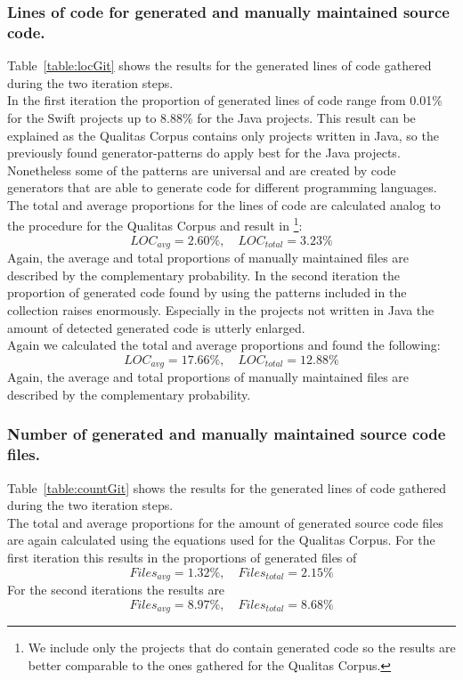 \subsubsection{Lines of code for generated and manually maintained source code.}
Table~\ref{table:locGit} shows the results for the generated lines of code gathered during the two iteration steps.\\
In the first iteration the proportion of generated lines of code range from 0.01\% for the Swift projects up to 8.88\% for the Java projects. This result can be explained as the Qualitas Corpus contains only projects written in Java, so the previously found generator-patterns do apply best for the Java projects. Nonetheless some of the patterns are universal and are created by code generators that are able to generate code for different programming languages.\\
The total and average proportions for the lines of code are calculated analog to the procedure for the Qualitas Corpus and result in
\footnote{
	\label{note:onlyGenerated}
	We include only the projects that do contain generated code so the results are better comparable to the ones gathered for the Qualitas Corpus.
}:
\begin{equation}
	\label{eq:locGit_1}
	LOC_{avg} = 2.60\%, \quad LOC_{total} = 3.23\%
\end{equation}
Again, the average and total proportions of manually maintained files are described by the complementary probability.
In the second iteration the proportion of generated code found by using the patterns included in the collection raises enormously. Especially in the projects not written in Java the amount of detected generated code is utterly enlarged.\\
Again we calculated the total and average proportions and found the following:
\begin{equation}
\label{eq:locGit_2}
LOC_{avg} = 17.66\%, \quad LOC_{total} = 12.88\%
\end{equation}
Again, the average and total proportions of manually maintained files are described by the complementary probability.


\subsubsection{Number of generated and manually maintained source code files.}
Table~\ref{table:countGit} shows the results for the generated lines of code gathered during the two iteration steps.\\
The total and average proportions for the amount of generated source code files are again calculated using the equations used for the Qualitas Corpus.
For the first iteration this results in the proportions of generated files of
\begin{equation}
\label{eq:countGit_1}
	Files_{avg} = 1.32\%, \quad Files_{total} = 2.15\%
\end{equation} 
For the second iterations the results are 
\begin{equation}
\label{eq:countGit_2}
Files_{avg} = 8.97\%, \quad Files_{total} = 8.68\%
\end{equation} 


